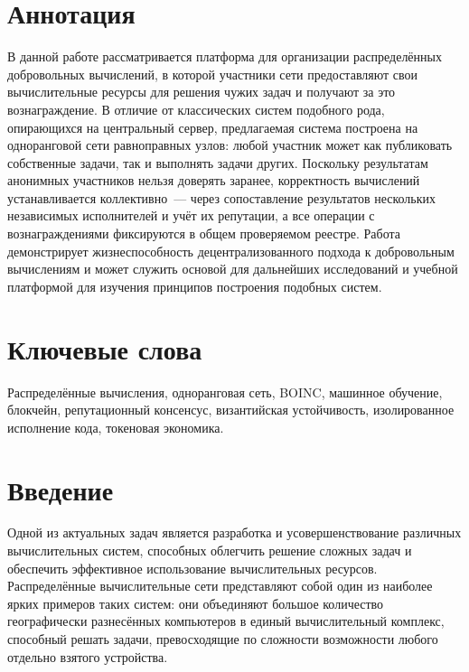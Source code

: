 \documentclass[a4paper,11pt]{extarticle}
\begin{document}

\newpage
\setcounter{page}{2}

{
	\hypersetup{linkcolor=black}
	\tableofcontents
}

\newpage

\section*{Аннотация}

В данной работе рассматривается платформа для организации распределённых
добровольных вычислений, в которой участники сети предоставляют свои
вычислительные ресурсы для решения чужих задач и получают за это вознаграждение.
В отличие от классических систем подобного рода, опирающихся на центральный
сервер, предлагаемая система построена на одноранговой сети равноправных узлов:
любой участник может как публиковать собственные задачи, так и выполнять задачи
других. Поскольку результатам анонимных участников нельзя доверять заранее,
корректность вычислений устанавливается коллективно~--- через сопоставление
результатов нескольких независимых исполнителей и учёт их репутации, а все
операции с вознаграждениями фиксируются в общем проверяемом реестре. Работа
демонстрирует жизнеспособность децентрализованного подхода к добровольным
вычислениям и может служить основой для дальнейших исследований и учебной
платформой для изучения принципов построения подобных систем.

\section*{Ключевые слова}

Распределённые вычисления, одноранговая сеть, BOINC, машинное обучение,
блокчейн, репутационный консенсус, византийская устойчивость, изолированное
исполнение кода, токеновая экономика.

\pagebreak

\section{Введение}

Одной из актуальных задач является разработка и
усовершенствование различных вычислительных систем, способных облегчить решение
сложных задач и обеспечить эффективное использование вычислительных ресурсов.
Распределённые вычислительные сети представляют собой один из наиболее ярких
примеров таких систем: они объединяют большое количество географически
разнесённых компьютеров в единый вычислительный комплекс, способный решать
задачи, превосходящие по сложности возможности любого отдельно взятого
устройства.
\end{document}
